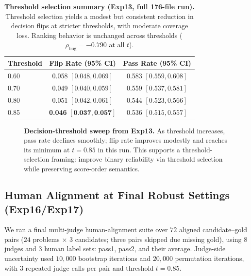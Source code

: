 \documentclass[numbers]{article}
\begin{document}
\begin{table}[t]
  \centering
  \small
  \begin{tabular}{lcc}
    \toprule
    \textbf{Threshold} & \textbf{Flip Rate (95\% CI)}                        & \textbf{Pass Rate (95\% CI)} \\
    \midrule
    0.60               & 0.058 \([0.048, 0.069]\)                            & 0.583 \([0.559, 0.608]\)     \\
    0.70               & 0.049 \([0.040, 0.059]\)                            & 0.559 \([0.537, 0.581]\)     \\
    0.80               & 0.051 \([0.042, 0.061]\)                            & 0.544 \([0.523, 0.566]\)     \\
    0.85               & \textbf{0.046} \([\textbf{0.037}, \textbf{0.057}]\) & 0.536 \([0.515, 0.557]\)     \\
    \bottomrule
  \end{tabular}
  \caption{\textbf{Threshold selection summary (Exp13, full 176-file run).}
    Threshold selection yields a modest but consistent reduction in decision flips at stricter thresholds, with moderate coverage loss.
    Ranking behavior is unchanged across thresholds (\(\rho_{\text{bug}}=-0.790\) at all \(t\)).}
  \label{tab:exp13_threshold_sweep}
\end{table}

\begin{figure}[t]
  \centering
  \resizebox{\linewidth}{!}{}
  \caption{\textbf{Decision-threshold sweep from Exp13.}
    As threshold increases, pass rate declines smoothly; flip rate improves modestly and reaches its minimum at \(t=0.85\) in this run.
    This supports a threshold-selection framing: improve binary reliability via threshold selection while preserving score-order semantics.}
  \label{fig:exp13_threshold_curve}
\end{figure}

\subsection{Human Alignment at Final Robust Settings (Exp16/Exp17)}
We ran a final multi-judge human-alignment suite over \(72\) aligned candidate--gold pairs (\(24\) problems \(\times\) \(3\) candidates; three pairs skipped due missing gold), using \(8\) judges and \(3\) human label sets: pass1, pass2, and their average.
Judge-side uncertainty used \(10{,}000\) bootstrap iterations and \(20{,}000\) permutation iterations, with \(3\) repeated judge calls per pair and threshold \(t=0.85\).
\end{document}

